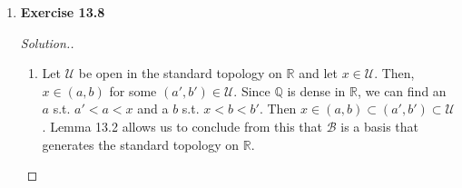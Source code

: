 \documentclass{article}
\newcommand{\T}{\mathcal{T}}
\newcommand{\U}{\mathcal{U}}
\newcommand{\R}{\mathbb{R}}
\newcommand{\B}{\mathcal{B}}
\newcommand{\sk}{\smallskip}
\begin{document}
\begin{enumerate}
\begin{proof}[Solution.]
        \sk
        
        However, if $\U \in \T_1$, then $\U = (a, b)$, and so $\U^c$ is not finite or all of $\R$, so $\U \notin \T_3$. Thus, $\T_1 \not\subset \T_3$

        \sk

        Let $\U \in \T_5$, so $\U = (-\infty, a)$. Then clearly $\U \in \T_1$, so $\T_5 \subset \T_1$ 

        \sk

        However, if $\U = (0, 1)$, then $\U \notin \T_5$, so $\T_1 \not\subset \T_5$

        \sk

        \underline{$\T_3$ and $\T_5$ are not comparable.}

        \sk

        Let $\U \in \T_5,$ so $\U = (-\infty, a)$. Then $\U^c$ is not finite or all of $\R$, so $\U \notin \T_3$. 
        
        \sk
        
        Let $\U \in \T_3$, so $\U^c$ is finite or $\U = \emptyset$. If $\U = \emptyset, \U \neq (-\infty, a)$ and if $\U^c$ is finite, then $\U \neq (-\infty, a)$.

        We can now create a chain of inclusions:

        \begin{center}
        \end{center}

        where a topology being above another means it contains it. 
    \end{proof}

    \item 
    \textbf{Exercise 13.8}
    \begin{proof}[Solution.]
        \begin{enumerate}
            \item Let $\U$ be open in the standard topology on $\R$ and let $x \in \U$. Then, $x \in (a, b)$ for some $(a', b') \in \U$. Since $\mathbb{Q}$ is dense in $\R$, we can find an $a$ s.t. $a' < a < x$ and a $b$ s.t. $x < b < b'$. Then $x \in (a, b) \subset (a', b') \subset \U$. Lemma 13.2 allows us to conclude from this that $\B$ is a basis that generates the standard topology on $\R$. 


\end{enumerate}
\end{proof}
\end{enumerate}
\end{document}

